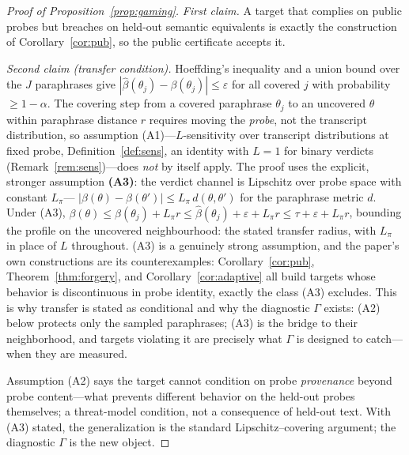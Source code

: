 \begin{proof}[Proof of Proposition~\ref{prop:gaming}]
\emph{First claim.} A target that complies on public probes but breaches on
held-out semantic equivalents is exactly the construction of
Corollary~\ref{cor:pub}, so the public certificate accepts it.

\emph{Second claim (transfer condition).} Hoeffding's inequality and a union
bound over the $J$ paraphrases give
$|\hat\beta(\theta_j)-\beta(\theta_j)|\le\varepsilon$ for all covered $j$
with probability $\ge1-\alpha$. The covering step from a covered
paraphrase $\theta_j$ to an uncovered $\theta$ within paraphrase distance
$r$ requires moving the \emph{probe}, not the transcript distribution, so
assumption (A1)---$L$-sensitivity over transcript distributions at fixed
probe, Definition~\ref{def:sens}, an identity with $L=1$ for binary
verdicts (Remark~\ref{rem:sens})---does \emph{not} by itself apply. The
proof uses the explicit, stronger assumption \textbf{(A3)}: the verdict
channel is Lipschitz over probe space with constant $L_{\pi}$---%
$|\beta(\theta)-\beta(\theta')|\le L_{\pi}\,d(\theta,\theta')$ for the
paraphrase metric $d$. Under (A3),
$\beta(\theta)\le\beta(\theta_j)+L_{\pi}r\le\hat\beta(\theta_j)
+\varepsilon+L_{\pi}r\le\tau+\varepsilon+L_{\pi}r$, bounding the profile on
the uncovered neighbourhood: the stated transfer radius, with $L_{\pi}$ in
place of $L$ throughout. (A3) is a genuinely strong assumption, and the
paper's own constructions are its counterexamples:
Corollary~\ref{cor:pub}, Theorem~\ref{thm:forgery}, and
Corollary~\ref{cor:adaptive} all build targets whose behavior is
discontinuous in probe identity, exactly the class (A3) excludes. This is
why transfer is stated as conditional and why the diagnostic $\Gamma$
exists: (A2) below protects only the sampled paraphrases; (A3) is the
bridge to their neighborhood, and targets violating it are precisely what
$\Gamma$ is designed to catch---when they are measured.

Assumption (A2) says the target cannot condition on probe \emph{provenance}
beyond probe content---what prevents different behavior on the held-out
probes themselves; a threat-model condition, not a consequence of held-out
text. With (A3) stated, the generalization is the standard
Lipschitz--covering argument; the diagnostic $\Gamma$ is the new object.
\end{proof}

